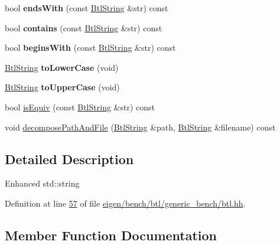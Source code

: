 \begin{DoxyCompactItemize}
bool {\bfseries ends\+With} (const \hyperlink{class_btl_string}{Btl\+String} \&str) const
\item 
\mbox{\label{class_btl_string_aa8f891f0f2ee7464261da613499cf6fe}} 
bool {\bfseries contains} (const \hyperlink{class_btl_string}{Btl\+String} \&str) const
\item 
\mbox{\label{class_btl_string_a203047e1fec3af232da616e79bb96a6a}} 
bool {\bfseries begins\+With} (const \hyperlink{class_btl_string}{Btl\+String} \&str) const
\item 
\mbox{\label{class_btl_string_ada1b52b906ff481c13f55b7373386489}} 
\hyperlink{class_btl_string}{Btl\+String} {\bfseries to\+Lower\+Case} (void)
\item 
\mbox{\label{class_btl_string_a2f5dfde0fecaeaf2d2bb359c0cdb22cb}} 
\hyperlink{class_btl_string}{Btl\+String} {\bfseries to\+Upper\+Case} (void)
\item 
bool \hyperlink{class_btl_string_afdc2da5f185fa7585b1363b2dd6b36cb}{is\+Equiv} (const \hyperlink{class_btl_string}{Btl\+String} \&str) const
\item 
void \hyperlink{class_btl_string_a111377f6625fffeed8f02992fd164730}{decompose\+Path\+And\+File} (\hyperlink{class_btl_string}{Btl\+String} \&path, \hyperlink{class_btl_string}{Btl\+String} \&filename) const
\end{DoxyCompactItemize}


\subsection{Detailed Description}
Enhanced std\+::string 

Definition at line \hyperlink{eigen_2bench_2btl_2generic__bench_2btl_8hh_source_l00057}{57} of file \hyperlink{eigen_2bench_2btl_2generic__bench_2btl_8hh_source}{eigen/bench/btl/generic\+\_\+bench/btl.\+hh}.



\subsection{Member Function Documentation}
\mbox{\label{class_btl_string_a111377f6625fffeed8f02992fd164730}} 
